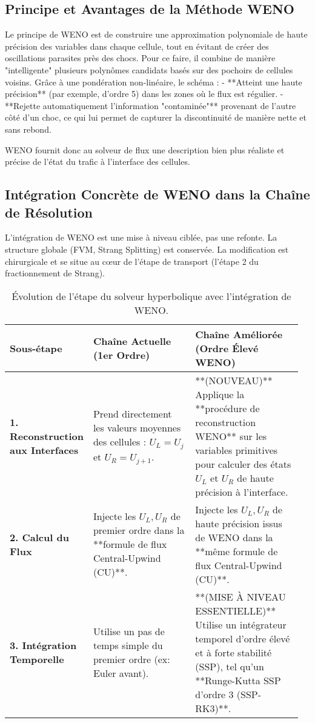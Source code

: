 \subsection{Principe et Avantages de la Méthode WENO}

Le principe de WENO est de construire une approximation polynomiale de haute précision des variables dans chaque cellule, tout en évitant de créer des oscillations parasites près des chocs. Pour ce faire, il combine de manière "intelligente" plusieurs polynômes candidats basés sur des pochoirs de cellules voisins. Grâce à une pondération non-linéaire, le schéma :
- **Atteint une haute précision** (par exemple, d'ordre 5) dans les zones où le flux est régulier.
- **Rejette automatiquement l'information "contaminée"** provenant de l'autre côté d'un choc, ce qui lui permet de capturer la discontinuité de manière nette et sans rebond.

WENO fournit donc au solveur de flux une description bien plus réaliste et précise de l'état du trafic à l'interface des cellules.

\subsection{Intégration Concrète de WENO dans la Chaîne de Résolution}

L'intégration de WENO est une mise à niveau ciblée, pas une refonte. La structure globale (FVM, Strang Splitting) est conservée. La modification est chirurgicale et se situe au cœur de l'étape de transport (l'étape 2 du fractionnement de Strang).

\begin{table}[h!]
\centering
\caption{Évolution de l'étape du solveur hyperbolique avec l'intégration de WENO.}
\label{tab:evolution_weno}
\begin{tabular}{|p{0.2\linewidth}|p{0.38\linewidth}|p{0.38\linewidth}|}
\hline
\textbf{Sous-étape} & \textbf{Chaîne Actuelle (1er Ordre)} & \textbf{Chaîne Améliorée (Ordre Élevé WENO)} \\
\hline
\textbf{1. Reconstruction aux Interfaces} & Prend directement les valeurs moyennes des cellules : \(U_L = U_j\) et \(U_R = U_{j+1}\). & **(NOUVEAU)** Applique la **procédure de reconstruction WENO** sur les variables primitives pour calculer des états \(U_L\) et \(U_R\) de haute précision à l'interface. \\
\hline
\textbf{2. Calcul du Flux} & Injecte les \(U_L, U_R\) de premier ordre dans la **formule de flux Central-Upwind (CU)**. & Injecte les \(U_L, U_R\) de haute précision issus de WENO dans la **même formule de flux Central-Upwind (CU)**. \\
\hline
\textbf{3. Intégration Temporelle} & Utilise un pas de temps simple du premier ordre (ex: Euler avant). & **(MISE À NIVEAU ESSENTIELLE)** Utilise un intégrateur temporel d'ordre élevé et à forte stabilité (SSP), tel qu'un **Runge-Kutta SSP d'ordre 3 (SSP-RK3)**. \\
\hline
\end{tabular}
\end{table}

